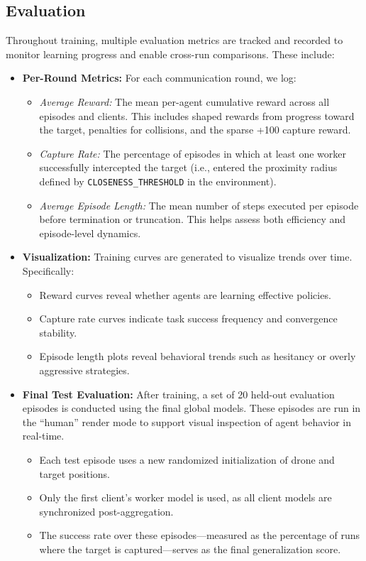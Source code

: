 \documentclass[12pt,a4paper,twoside,openany]{book}
\begin{document}
\subsection{Evaluation} \label{subsec:evaluation}

Throughout training, multiple evaluation metrics are tracked and recorded to monitor learning progress and enable cross-run comparisons. These include:

\begin{itemize}
  \item \textbf{Per-Round Metrics:} For each communication round, we log:
  \begin{itemize}
    \item \textit{Average Reward:} The mean per-agent cumulative reward across all episodes and clients. This includes shaped rewards from progress toward the target, penalties for collisions, and the sparse +100 capture reward.
    \item \textit{Capture Rate:} The percentage of episodes in which at least one worker successfully intercepted the target (i.e., entered the proximity radius defined by \texttt{CLOSENESS\_THRESHOLD} in the environment).
    \item \textit{Average Episode Length:} The mean number of steps executed per episode before termination or truncation. This helps assess both efficiency and episode-level dynamics.
  \end{itemize}

  \item \textbf{Visualization:} Training curves are generated to visualize trends over time. Specifically:
  \begin{itemize}
    \item Reward curves reveal whether agents are learning effective policies.
    \item Capture rate curves indicate task success frequency and convergence stability.
    \item Episode length plots reveal behavioral trends such as hesitancy or overly aggressive strategies.
  \end{itemize}

  \item \textbf{Final Test Evaluation:} After training, a set of 20 held-out evaluation episodes is conducted using the final global models. These episodes are run in the ``human'' render mode to support visual inspection of agent behavior in real-time.
  \begin{itemize}
    \item Each test episode uses a new randomized initialization of drone and target positions.
    \item Only the first client’s worker model is used, as all client models are synchronized post-aggregation.
    \item The success rate over these episodes—measured as the percentage of runs where the target is captured—serves as the final generalization score.
  \end{itemize}
\end{itemize}
\end{document}
